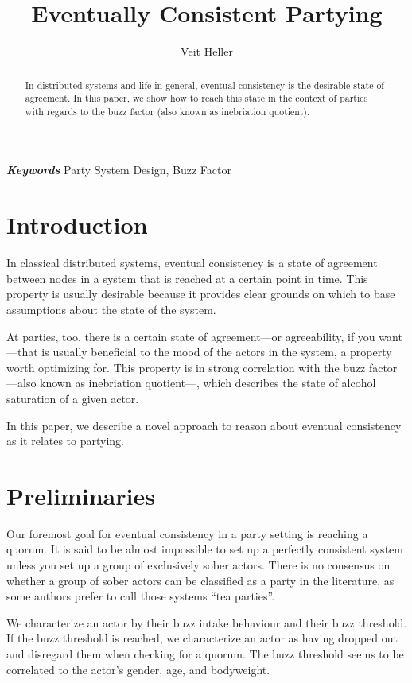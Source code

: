 \documentclass[twocolumn]{article}
\providecommand{\keywords}[1]{\noindent \textbf{\textit{Keywords}} #1}
\begin{document}
\title{Eventually Consistent Partying}
\author{Veit Heller}

\maketitle

\begin{abstract}
In distributed systems and life in general, eventual consistency is the
desirable state of agreement. In this paper, we show how to reach this state in
the context of parties with regards to the buzz factor (also known as
inebriation quotient).
\end{abstract}

\bigskip

\keywords{Party System Design, Buzz Factor}

\section{Introduction}

In classical distributed systems, eventual consistency is a state of agreement
between nodes in a system that is reached at a certain point in time. This
property is usually desirable because it provides clear grounds on which to
base assumptions about the state of the system.

At parties, too, there is a certain state of agreement—or agreeability, if you
want—that is usually beneficial to the mood of the actors in the system, a
property worth optimizing for. This property is in strong correlation with the
buzz factor—also known as inebriation quotient—, which describes the state of
alcohol saturation of a given actor.

In this paper, we describe a novel approach to reason about eventual
consistency as it relates to partying.

\section{Preliminaries}

Our foremost goal for eventual consistency in a party setting is reaching a
quorum. It is said to be almost impossible to set up a perfectly consistent
system unless you set up a group of exclusively sober actors. There is no
consensus on whether a group of sober actors can be classified as a party in
the literature, as some authors prefer to call those systems “tea parties”.

We characterize an actor by their buzz intake behaviour and their buzz
threshold. If the buzz threshold is reached, we characterize an actor as having
dropped out and disregard them when checking for a quorum. The buzz threshold
seems to be correlated to the actor’s gender, age, and bodyweight.
\end{document}
